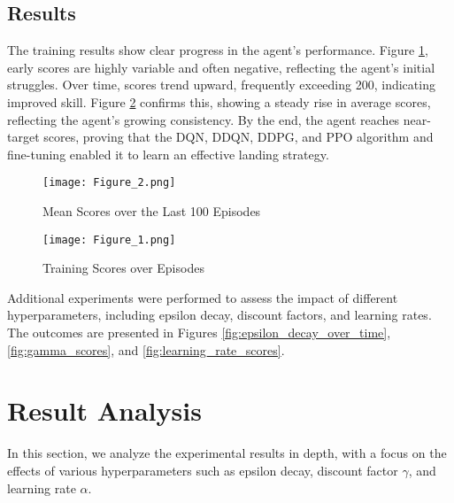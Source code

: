 \documentclass[conference]{IEEEtran}
\begin{document}
\subsection{Results}
The training results show clear progress in the agent’s performance. Figure \ref{fig:mean_scores}, early scores are highly variable and often negative, reflecting the agent's initial struggles. Over time, scores trend upward, frequently exceeding 200, indicating improved skill. Figure \ref{fig:training_scores} confirms this, showing a steady rise in average scores, reflecting the agent's growing consistency. By the end, the agent reaches near-target scores, proving that the DQN, DDQN, DDPG, and PPO algorithm and fine-tuning enabled it to learn an effective landing strategy. 

\begin{figure}[!ht]
    \centering
    \texttt{[image: Figure\_2.png]}
    \centering
    \caption{Mean Scores over the Last 100 Episodes}
    \label{fig:mean_scores}
\end{figure}

\begin{figure}[!ht]
    \centering
    \texttt{[image: Figure\_1.png]}
    \centering
    \caption{Training Scores over Episodes}
    \label{fig:training_scores}
\end{figure}


Additional experiments were performed to assess the impact of different hyperparameters, including epsilon decay, discount factors, and learning rates. The outcomes are presented in Figures \ref{fig:epsilon_decay_over_time}, \ref{fig:gamma_scores}, and \ref{fig:learning_rate_scores}. 

\section{Result Analysis}

In this section, we analyze the experimental results in depth, with a focus on the effects of various hyperparameters such as epsilon decay, discount factor $\gamma$, and learning rate $\alpha$. 

\end{document}
